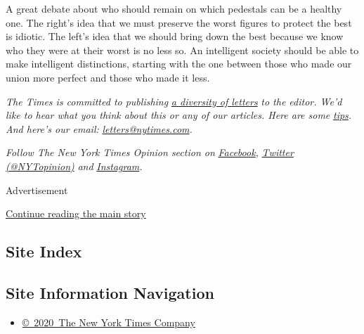 A great debate about who should remain on which pedestals can be a
healthy one. The right's idea that we must preserve the worst figures to
protect the best is idiotic. The left's idea that we should bring down
the best because we know who they were at their worst is no less so. An
intelligent society should be able to make intelligent distinctions,
starting with the one between those who made our union more perfect and
those who made it less.

\emph{The Times is committed to publishing}
\href{https://www.nytimes.com/2019/01/31/opinion/letters/letters-to-editor-new-york-times-women.html}{\emph{a
diversity of letters}} \emph{to the editor. We'd like to hear what you
think about this or any of our articles. Here are some}
\href{https://help.nytimes.com/hc/en-us/articles/115014925288-How-to-submit-a-letter-to-the-editor}{\emph{tips}}\emph{.
And here's our email:}
\href{mailto:letters@nytimes.com}{\emph{letters@nytimes.com}}\emph{.}

\emph{Follow The New York Times Opinion section on}
\href{https://www.facebook.com/nytopinion}{\emph{Facebook}}\emph{,}
\href{http://twitter.com/NYTOpinion}{\emph{Twitter (@NYTopinion)}}
\emph{and}
\href{https://www.instagram.com/nytopinion/}{\emph{Instagram}}\emph{.}

Advertisement

\protect\hyperlink{after-bottom}{Continue reading the main story}

\hypertarget{site-index}{%
\subsection{Site Index}\label{site-index}}

\hypertarget{site-information-navigation}{%
\subsection{Site Information
Navigation}\label{site-information-navigation}}

\begin{itemize}
\tightlist
\item
  \href{https://help.nytimes.com/hc/en-us/articles/115014792127-Copyright-notice}{©~2020~The
  New York Times Company}
\end{itemize}

